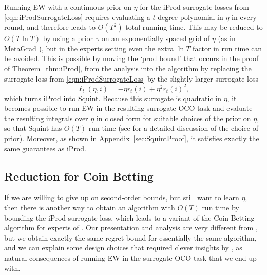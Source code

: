 \documentclass{colt2018} %
\newcommand{\sloss}{\ell}                       %
\begin{document}
Running EW with a continuous prior on $\eta$ for the iProd surrogate losses
from \eqref{eqn:iProdSurrogateLoss} requires evaluating a $t$-degree
polynomial in $\eta$ in every round, and therefore leads to $O(T^2)$
total running time. This may be reduced to $O(T \ln T)$ by using a
prior $\gamma$ on an exponentially spaced grid of $\eta$ (as in MetaGrad
\citep{VanErvenKoolen2016}), but in the experts setting even the extra
$\ln T$ factor in run time can be avoided. This is possible by moving
the `prod bound' that occurs in the proof of Theorem~\ref{thm:iProd},
from the analysis into the algorithm by replacing the surrogate loss
from \eqref{eqn:iProdSurrogateLoss} by the slightly larger surrogate
loss
% 
\begin{equation}\label{eqn:SquintSurrogateLoss}
  \sloss_t(\eta,i) = -\eta r_t(i) + \eta^2 r_t(i)^2,
\end{equation}
% 
which turns iProd into Squint. Because this surrogate is quadratic in
$\eta$, it becomes possible to run EW in the resulting surrogate OCO
task and evaluate the resulting integrals over $\eta$ in closed form for
suitable choices of the prior on $\eta$, so that Squint has $O(T)$ run
time (see \citet{KoolenVanErven2015} for a detailed discussion of the
choice of prior). Moreover, as shown in Appendix~\ref{sec:SquintProof},
it satisfies exactly the same guarantees as iProd.

\subsection{Reduction for Coin Betting}

If we are willing to give up on second-order bounds, but still want to
learn $\eta$, then there is another way to obtain an algorithm with
$O(T)$ run time by bounding the iProd surrogate loss, which leads to a
variant of the Coin Betting algorithm for experts of
\citet{OrabonaPal2016}. Our presentation and analysis are very
different from \citep{OrabonaPal2016}, but we obtain exactly the same
regret bound for essentially the same algorithm, and we can explain some
design choices that required clever insights by \citet{OrabonaPal2016},
as natural consequences of running EW in the surrogate OCO task that we
end up with.
\end{document}
